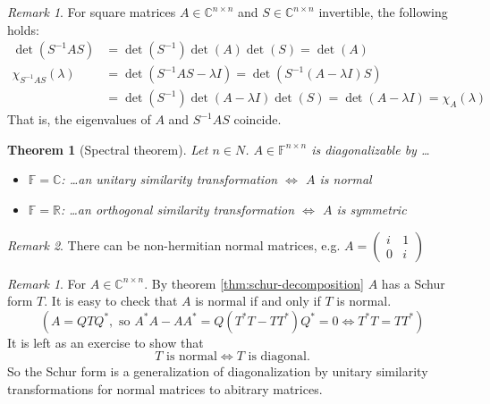 \documentclass[12pt]{article}
\newcounter{lecture}
\newtheorem*{theorem*}{Theorem}
\theoremstyle{definition}
\theoremstyle{remark}
\newtheorem{remark}[theorem]{Remark}
\newtheorem*{remark*}{Remark}
\numberwithin{equation}{section}
\newcommand{\F}{\mathbb{F}}
\newcommand{\R}{\mathbb{R}}
\newcommand{\C}{\mathbb{C}}
\begin{document}
\begin{remark*} For square matrices $A \in \C^{n \times n}$ and $S \in \C^{n \times n}$ invertible, the following holds:
  \begin{align*}
    \det(S^{-1}AS) &= \det(S^{-1}) \det(A) \det(S) = \det(A) \\
    \chi_{S^{-1}AS}(\lambda) &= \det(S^{-1}AS - \lambda I) = \det(S^{-1}(A - \lambda I)S) \\
    &= \det(S^{-1}) \det(A - \lambda I) \det(S) = \det(A - \lambda I) = \chi_A(\lambda)
  \end{align*}
  That is, the eigenvalues of $A$ and $S^{-1}AS$ coincide.
\end{remark*}

{\color{red}
  \begin{theorem*}[Spectral theorem]
    Let $n\in N$. $A \in \F^{n \times n}$ is diagonalizable by \dots
    \begin{itemize}[label={}]
      \item $\F = \C$: \dots an unitary similarity transformation $\Leftrightarrow$ $A$ is normal
      \item $\F = \R$: \dots an orthogonal similarity transformation $\Leftrightarrow$ $A$ is symmetric
    \end{itemize}
\end{theorem*}}

\begin{remark*}
  There can be non-hermitian normal matrices, e.g. $A =
  \begin{pmatrix}
    i & 1 \\ 0 & i
  \end{pmatrix}$
\end{remark*}

\begin{remark}
  For $A \in \C^{n \times n}$. By theorem \ref{thm:schur-decomposition} $A$ has a Schur form $T$. It is easy to check that $A$ is normal if and only if $T$ is normal.
  \begin{equation*}
    (A = QTQ^*, \text{ so } A^*A - AA^* = Q(T^*T - TT^*)Q^* = 0 \Leftrightarrow T^*T = TT^*)
  \end{equation*}
  It is left as an exercise to show that
  \begin{equation*}
    T \text{ is normal} \Leftrightarrow T \text{ is diagonal}.
  \end{equation*}
  So the Schur form is a generalization of diagonalization by unitary similarity transformations for normal matrices to abitrary matrices.
\end{remark}
\end{document}
